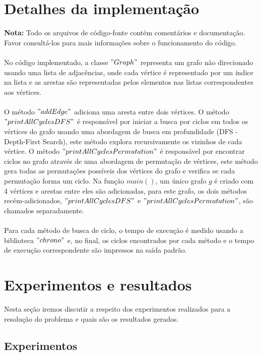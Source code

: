 \documentclass[12pt]{article}
\begin{document}
\section{Detalhes da implementação} \label{sec:firstpage}

\textbf{Nota:} Todo os arquivos de código-fonte contém comentários e documentação. Favor consultá-los para mais informações sobre o funcionamento do código.
\\ \\
No código implementado, a classe $"Graph"$ representa um grafo não direcionado usando uma lista de adjacências, onde cada vértice é representado por um índice na lista e as arestas são representadas pelos elementos nas listas correspondentes aos vértices.
\\ \\
O método $"addEdge"$ adiciona uma aresta entre dois vértices. O método $"printAllCyclesDFS"$ é responsável por iniciar a busca por ciclos em todos os vértices do grafo usando uma abordagem de busca em profundidade (DFS - Depth-First Search), este método explora recursivamente os vizinhos de cada vértice. O método $"printAllCyclesPermutation"$ é responsável por encontrar ciclos no grafo através de uma abordagem de permutação de vértices, este método gera todas as permutações possíveis dos vértices do grafo e verifica se cada permutação forma um ciclo. Na função $main()$, um único grafo $g$ é criado com 4 vértices e arestas entre eles são adicionadas, para este grafo, os dois métodos recém-adicionados, $"printAllCyclesDFS"$ e $"printAllCyclesPermutation"$, são chamados separadamente.
\\ \\
Para cada método de busca de ciclo, o tempo de execução é medido usando a biblioteca $"chrono"$ e, no final, os ciclos encontrados por cada método e o tempo de execução correspondente são impressos na saída padrão.

\section{Experimentos e resultados}

Nesta seção iremos discutir a respeito dos experimentos realizados para a resolução do problema e quais são os resultados gerados.

\subsection{Experimentos}
\end{document}
